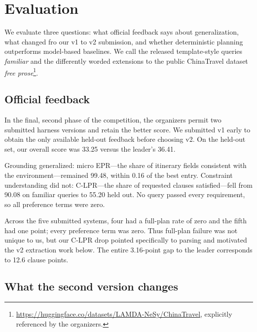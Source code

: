 \documentclass{article}
\begin{document}
\section{Evaluation}
\label{sec:evaluation}

We evaluate three questions: what official feedback says about generalization,
what changed fro our v1 to v2 submission, and whether deterministic planning outperforms
model-based baselines. We call the released template-style queries
\emph{familiar} and the differently worded extensions to the public ChinaTravel
dataset \emph{free prose}\footnote{\url{https://huggingface.co/datasets/LAMDA-NeSy/ChinaTravel},
explicitly referenced by the organizers.}.

\subsection{Official feedback}

In the final, second phase of the competition, the organizers permit two submitted harness versions and retain the better score.
We submitted v1 early to obtain the only available held-out feedback before
choosing v2. On the held-out set, our overall score was 33.25 versus the leader's 36.41.

Grounding generalized: micro EPR---the share of itinerary fields consistent with
the environment---remained 99.48, within 0.16 of the best entry. Constraint
understanding did not: C-LPR---the share of requested clauses satisfied---fell
from 90.08 on familiar queries to 55.20 held out. No query passed every
requirement, so all preference terms were zero.

Across the five submitted systems, four had a full-plan rate of zero and the
fifth had one point; every preference term was zero. Thus full-plan failure was not
unique to us, but our C-LPR drop pointed specifically to parsing and motivated
the v2 extraction work below. The entire 3.16-point gap to the leader corresponds
to 12.6 clause points.

\subsection{What the second version changes}
\end{document}
